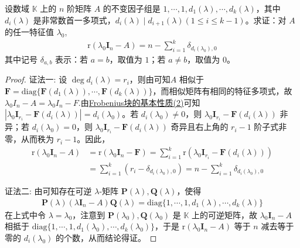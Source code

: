 \documentclass[../../main.tex]{subfiles}%
\begin{document}
\begin{proposition}\label{proposition:特征值对应的特征矩阵的秩与不变因子组的关系}
设数域 $\mathbb{K}$ 上的 $n$ 阶矩阵 $A$ 的不变因子组是 $1,\cdots,1,d_1(\lambda),\cdots,d_k(\lambda)$，其中 $d_i(\lambda)$ 是非常数首一多项式，$d_i(\lambda)\mid d_{i + 1}(\lambda) (1\leqslant  i\leqslant  k - 1)$。求证：对 $A$ 的任一特征值 $\lambda_0$,
\begin{align*}
\mathrm{r}(\lambda_0\boldsymbol{I}_n - A)=n - \sum_{i = 1}^{k}\delta_{d_i(\lambda_0),0}
\end{align*}
其中记号 $\delta_{a,b}$ 表示：若 $a = b$，取值为 $1$；若 $a\neq b$，取值为 $0$。
\end{proposition}
\begin{proof}

{\color{blue}证法一:}
设 $\deg d_i(\lambda)=r_i$，则由可知$A$ 相似于 $\boldsymbol{F}=\mathrm{diag}\{\boldsymbol{F}(d_1(\lambda)),\cdots,\boldsymbol{F}(d_k(\lambda))\}$，而相似矩阵有相同的特征多项式，故$\lambda_0I_n-A=\lambda_0I_n-F$.由\hyperref[lemma:Frobenius标准型矩阵的极小多项式和不变因子]{Frobenius块的基本性质(2)}可知$|\lambda_0\boldsymbol{I}_{r_i}-\boldsymbol{F}(d_i(\lambda))|=d_i(\lambda_0)$。若 $d_i(\lambda_0)\neq 0$，则 $\lambda_0\boldsymbol{I}_{r_i}-\boldsymbol{F}(d_i(\lambda))$ 非异；若 $d_i(\lambda_0)=0$，则 $\lambda_0\boldsymbol{I}_{r_i}-\boldsymbol{F}(d_i(\lambda))$ 奇异且右上角的 $r_i - 1$ 阶子式非零，从而秩为 $r_i - 1$。因此，
\begin{align*}
\mathrm{r}(\lambda_0\boldsymbol{I}_n - A)&=\mathrm{r}(\lambda_0\boldsymbol{I}_n - \boldsymbol{F})=\sum_{i = 1}^{k}\mathrm{r}(\lambda_0\boldsymbol{I}_{r_i}-\boldsymbol{F}(d_i(\lambda)))\\
&=\sum_{i = 1}^{k}(r_i - \delta_{d_i(\lambda_0),0})=n - \sum_{i = 1}^{k}\delta_{d_i(\lambda_0),0}
\end{align*}

{\color{blue}证法二:}
由可知存在可逆 $\lambda$-矩阵 $\boldsymbol{P}(\lambda),\boldsymbol{Q}(\lambda)$，使得
\begin{align*}
\boldsymbol{P}(\lambda)(\lambda\boldsymbol{I}_n - A)\boldsymbol{Q}(\lambda)=\mathrm{diag}\{1,\cdots,1,d_1(\lambda),\cdots,d_k(\lambda)\}
\end{align*}
在上式中令 $\lambda = \lambda_0$，注意到 $\boldsymbol{P}(\lambda_0),\boldsymbol{Q}(\lambda_0)$ 是 $\mathbb{K}$ 上的可逆矩阵，故 $\lambda_0\boldsymbol{I}_n - A$ 相抵于 $\mathrm{diag}\{1,\cdots,1,d_1(\lambda_0),\cdots,d_k(\lambda_0)\}$，于是 $\mathrm{r}(\lambda_0\boldsymbol{I}_n - A)$ 等于 $n$ 减去等于零的 $d_i(\lambda_0)$ 的个数，从而结论得证。

\end{proof}
\end{document}
